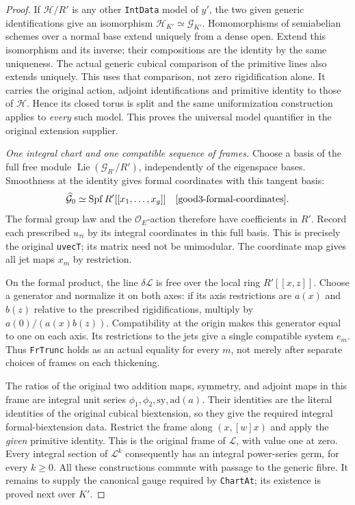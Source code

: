 \begin{proof}
If $\mathcal H/R'$ is any other \texttt{IntData} model of $y'$,
the two given generic identifications give an isomorphism
$\mathcal H_{K'}\simeq\mathcal G_{K'}$.
Homomorphisms of semiabelian schemes over a normal base extend
uniquely from a dense open.  Extend this isomorphism and its inverse;
their compositions are the identity by the same uniqueness.
The actual generic cubical comparison of the primitive lines also
extends uniquely\cite[Propositions 3.3.1.5 and 3.3.2.2]{good3-lan}.
This uses that comparison, not zero rigidification alone.
It carries the original action, adjoint identifications and primitive
identity to those of $\mathcal H$.  Hence its closed torus is split
and the same uniformization construction applies to \emph{every}
such model.  This proves the universal model quantifier in the
original extension supplier.

\emph{One integral chart and one compatible sequence of frames.}
Choose a basis of the full free module
$\operatorname{Lie}(\mathcal G_{R'}/R')$, independently of the
eigenspace bases.  Smoothness at the identity gives formal coordinates
with this tangent basis:
\[
                  \widehat{\mathcal G}_{0}
                         \simeq\operatorname{Spf}R'[[x_1,\ldots,x_g]]
                         \quad\text{\cite{good3-formal-coordinates}}.
\]
The formal group law and the $\mathcal O_E$-action therefore have
coefficients in $R'$.  Record each prescribed $u_{\tau i}$ by its
integral coordinates in this full basis.  This is precisely the
original \texttt{uvecT}; its matrix need not be unimodular.
The coordinate map gives all jet maps $x_m$ by restriction.

On the formal product, the line $\delta\mathscr L$ is free over
the local ring $R'[[x,z]]$.  Choose a generator and normalize it on
both axes: if its axis restrictions are $a(x)$ and $b(z)$ relative
to the prescribed rigidifications, multiply by
$a(0)/(a(x)b(z))$.  Compatibility at the origin makes this generator
equal to one on each axis.  Its restrictions to the jets give a
single compatible system $e_m$.  Thus \texttt{FrTrunc} holds as an
actual equality for every $m$, not merely after separate choices of
frames on each thickening.

The ratios of the original two addition maps, symmetry, and adjoint
maps in this frame are integral unit series
$\phi_1,\phi_2,\mathrm{sy},\mathrm{ad}(a)$.  Their identities are
the literal identities of the original cubical biextension, so they
give the required integral formal-biextension data.  Restrict the
frame along $(x,[w]x)$ and apply the \emph{given} primitive identity.
This is the original frame of $\mathscr L$, with value one at zero.
Every integral section of $\mathscr L^k$ consequently has an integral
power-series germ, for every $k\geq0$.
All these constructions commute with passage to the generic fibre.
It remains to supply the canonical gauge required by
\texttt{ChartAt}; its existence is proved next over $K'$.
\end{proof}

